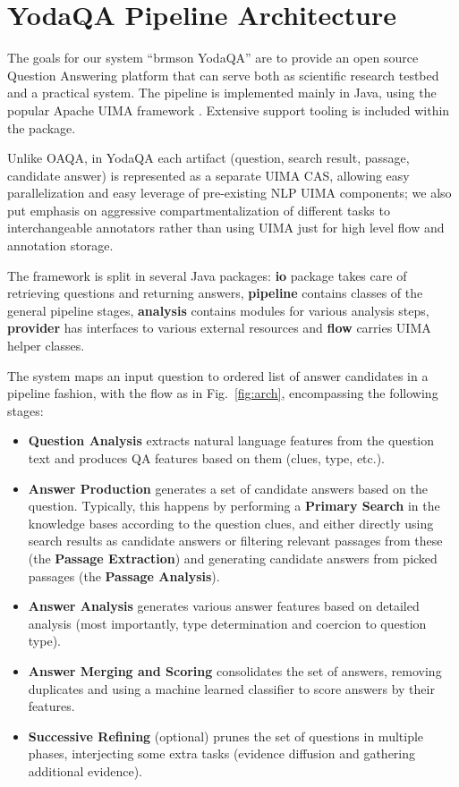 \documentclass{poster15}
\begin{document}
\section{YodaQA Pipeline Architecture}
\label{sec:yodaqaarch}

The goals for our system ``brmson YodaQA'' are to provide an open source
Question Answering platform that can serve both as scientific research
testbed and a practical system. The pipeline is implemented mainly in Java,
using the popular Apache UIMA framework \cite{UIMA}.  Extensive support
tooling is included within the package.

Unlike OAQA, in YodaQA each artifact (question, search result, passage,
candidate answer) is represented as a separate UIMA CAS, allowing easy
parallelization and easy leverage of pre-existing NLP UIMA components;
we also put emphasis on aggressive compartmentalization
of different tasks to interchangeable annotators rather than using
UIMA just for high level flow and annotation storage.

The framework is split in several Java packages: \textbf{io} package takes care
of retrieving questions and returning answers, \textbf{pipeline} contains
classes of the general pipeline stages, \textbf{analysis} contains
modules for various analysis steps, \textbf{provider} has interfaces
to various external resources and \textbf{flow} carries UIMA helper classes.

The system maps an input question to ordered list of answer candidates in a pipeline fashion,
with the flow as in Fig.~\ref{fig:arch}, encompassing the following stages:

\begin{itemize}
\item \textbf{Question Analysis} extracts natural language features from the question text and produces QA features based on them (clues, type, etc.).
\item \textbf{Answer Production} generates a set of candidate answers based on the question.
	Typically, this happens by performing a \textbf{Primary Search} in the knowledge bases according to the question clues,
	and either directly using search results as candidate answers
	or filtering relevant passages from these (the \textbf{Passage Extraction})
	and generating candidate answers from picked passages (the \textbf{Passage Analysis}).
\item \textbf{Answer Analysis} generates various answer features based on detailed analysis (most importantly, type determination and coercion to question type).
\item \textbf{Answer Merging and Scoring} consolidates the set of answers, removing duplicates and using a machine learned classifier to score answers by their features.
\item \textbf{Successive Refining} (optional) prunes the set of questions in multiple phases, interjecting some extra tasks (evidence diffusion and gathering additional evidence).
\end{itemize}
\end{document}
